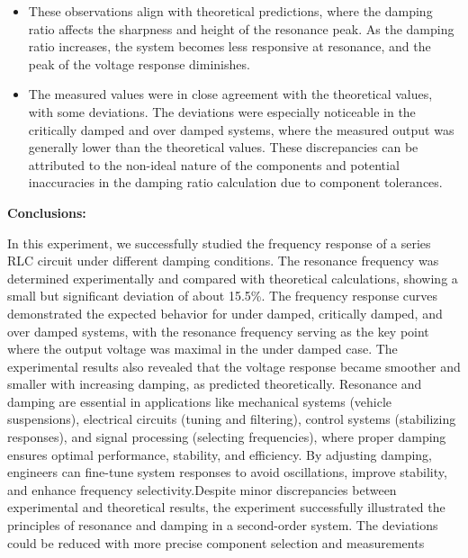 \documentclass[11pt]{scrreprt}
\begin{document}
\begin{itemize}
\begin{itemize}
    \item Over damped case ($\zeta$ = 2): For the over damped system, the voltage response is significantly smaller and decays rapidly as the frequency increases. There is no pronounced peak, and the system is slow to respond to changes in frequency.
    \end{itemize}
    
\item  These observations align with theoretical predictions, where the damping ratio affects the sharpness and height of the resonance peak. As the damping ratio increases, the system becomes less responsive at resonance, and the peak of the voltage response diminishes.
\item  The measured values were in close agreement with the theoretical values, with some deviations. The deviations were especially noticeable in the critically damped and over damped systems, where the measured output was generally lower than the theoretical values. These discrepancies can be attributed to the non-ideal nature of the components and potential inaccuracies in the damping ratio calculation due to component tolerances.
\end{itemize}

\newpage
\noindent\textbf{Conclusions:}


In this experiment, we successfully studied the frequency response of a series RLC circuit under different damping conditions. The resonance frequency was determined experimentally and compared with theoretical calculations, showing a small but significant deviation of about 15.5\%. The frequency response curves demonstrated the expected behavior for under damped, critically damped, and over damped systems, with the resonance frequency serving as the key point where the output voltage was maximal in the under damped case. The experimental results also revealed that the voltage response became smoother and smaller with increasing damping, as predicted theoretically.
Resonance and damping are essential in applications like mechanical systems (vehicle suspensions), electrical circuits (tuning and filtering), control systems (stabilizing responses), and signal processing (selecting frequencies), where proper damping ensures optimal performance, stability, and efficiency. By adjusting damping, engineers can fine-tune system responses to avoid oscillations, improve stability, and enhance frequency selectivity.Despite minor discrepancies between experimental and theoretical results, the experiment successfully illustrated the principles of resonance and damping in a second-order system. The deviations could be reduced with more precise component selection and measurements
\end{document}
